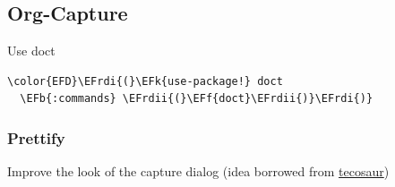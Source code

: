 \documentclass{scrartcl}
\newcommand{\EFk}[1]{\textcolor{EFk}{#1}} %
\newcommand{\EFb}[1]{\textcolor{EFb}{#1}} %
\newcommand{\EFf}[1]{\textcolor{EFf}{#1}} %
\newcommand{\EFrdi}[1]{#1} %
\newcommand{\EFrdii}[1]{#1} %
\begin{document}
\subsection{Org-Capture}
\label{sec:org28000b2}
Use doct
\begin{Code}
\begin{Verbatim}[]
\color{EFD}\EFrdi{(}\EFk{use-package!} doct
  \EFb{:commands} \EFrdii{(}\EFf{doct}\EFrdii{)}\EFrdi{)}
\end{Verbatim}
\end{Code}

\subsubsection{Prettify}
\label{sec:orgebbca5b}
Improve the look of the capture dialog (idea borrowed from \href{https://github.com/tecosaur}{tecosaur})
\end{document}
